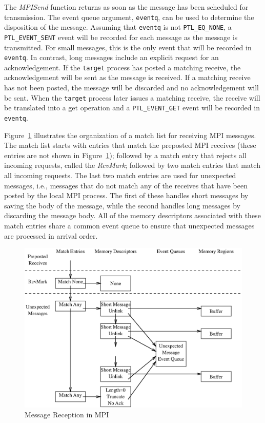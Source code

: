 \documentclass{sand-report}
\begin{document}
The \emph{MPISend} function returns as soon as the message has been
scheduled for transmission.  The event queue argument,
\texttt{eventq}, can be used to determine the disposition of the
message.  Assuming that \texttt{eventq} is not \texttt{PTL_EQ_NONE}, a
\texttt{PTL_EVENT_SENT} event will be recorded for each message as the
message is transmitted.  For small messages, this is the only event
that will be recorded in \texttt{eventq}.  In contrast, long messages
include an explicit request for an acknowledgement.  If the
\texttt{target} process has posted a matching receive, the
acknowledgement will be sent as the message is received.  If a
matching receive has not been posted, the message will be discarded
and no acknowledgement will be sent.  When the \texttt{target} process
later issues a matching receive, the receive will be translated into a
get operation and a \texttt{PTL_EVENT_GET} event will be recorded in
\texttt{eventq}.

Figure~\ref{fig:mpi} illustrates the organization of a match list for
receiving MPI messages.  The match list starts with entries that match
the preposted MPI receives (these entries are not shown in
Figure~\ref{fig:mpi}); followed by a match entry that rejects all
incoming requests, called the \emph{RcvMark}; followed by two match
entries that match all incoming requests.  The last two match entries
are used for unexpected messages, i.e., messages that do not match any
of the receives that have been posted by the local MPI process.  The
first of these handles short messages by saving the body of the
message, while the second handles long messages by discarding the
message body.  All of the memory descriptors associated with these
match entries share a common event queue to ensure that unexpected
messages are processed in arrival order.

\begin{figure}[htbp]
\centerline{\includegraphics{mpi.eps}}
\caption{Message Reception in MPI}
\label{fig:mpi}
\end{figure}
\end{document}
